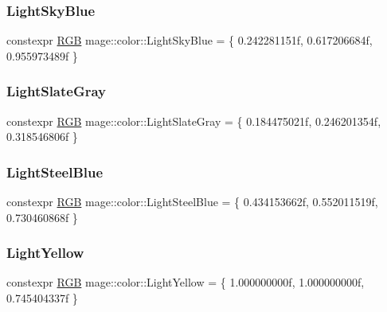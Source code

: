 \mbox{\label{namespacemage_1_1color_a9fd52a16c2c4ace303c2e1d6d33556af}} 
\subsubsection{\texorpdfstring{Light\+Sky\+Blue}{LightSkyBlue}}
{\footnotesize\ttfamily constexpr \mbox{\hyperlink{structmage_1_1_r_g_b}{R\+GB}} mage\+::color\+::\+Light\+Sky\+Blue = \{ 0.\+242281151f, 0.\+617206684f, 0.\+955973489f \}}

\mbox{\label{namespacemage_1_1color_a03509d568368a4918213130a9f44f55c}} 
\subsubsection{\texorpdfstring{Light\+Slate\+Gray}{LightSlateGray}}
{\footnotesize\ttfamily constexpr \mbox{\hyperlink{structmage_1_1_r_g_b}{R\+GB}} mage\+::color\+::\+Light\+Slate\+Gray = \{ 0.\+184475021f, 0.\+246201354f, 0.\+318546806f \}}

\mbox{\label{namespacemage_1_1color_a5ecb57996411f6b8927bfafb204208a3}} 
\subsubsection{\texorpdfstring{Light\+Steel\+Blue}{LightSteelBlue}}
{\footnotesize\ttfamily constexpr \mbox{\hyperlink{structmage_1_1_r_g_b}{R\+GB}} mage\+::color\+::\+Light\+Steel\+Blue = \{ 0.\+434153662f, 0.\+552011519f, 0.\+730460868f \}}

\mbox{\label{namespacemage_1_1color_a46b3fdd57b6933a6bafb704682e82518}} 
\subsubsection{\texorpdfstring{Light\+Yellow}{LightYellow}}
{\footnotesize\ttfamily constexpr \mbox{\hyperlink{structmage_1_1_r_g_b}{R\+GB}} mage\+::color\+::\+Light\+Yellow = \{ 1.\+000000000f, 1.\+000000000f, 0.\+745404337f \}}

